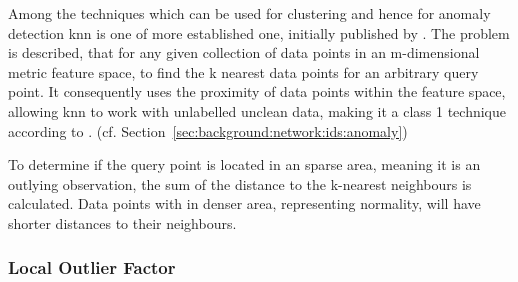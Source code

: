 Among the techniques which can be used for clustering and hence for anomaly detection \gls{knn} is one of more established one, initially published by \textcite{Fix1951}.
The problem is described, that for any given collection of data points in an m-dimensional metric feature space, to find the k nearest data points for an arbitrary query point. \parencite{Beyer1999}
It consequently uses the proximity of data points within the feature space, allowing \gls{knn} to work with unlabelled unclean data, making it a class 1 technique according to \textcite{Hodge2004}. (cf. Section~\ref{sec:background:network:ids:anomaly})

To determine if the query point is located in an sparse area, meaning it is an outlying observation, the sum of the distance to the k-nearest neighbours is calculated.
Data points with in denser area, representing normality, will have shorter distances to their neighbours. \parencite{Eskin2002}

\subsubsection{Local Outlier Factor}
\label{sec:background:network:novelty:lof}

